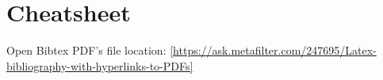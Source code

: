 
\chapter{Cheatsheet}

Open Bibtex PDF's file location:
\ref{https://ask.metafilter.com/247695/Latex-bibliography-with-hyperlinks-to-PDFs}